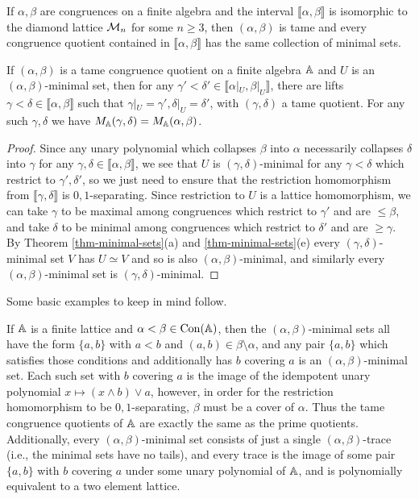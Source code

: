 \begin{appendices}
\begin{cor} If $\alpha,\beta$ are congruences on a finite algebra and the interval $\llbracket \alpha, \beta \rrbracket$ is isomorphic to the diamond lattice $\mathcal{M}_n$ for some $n \ge 3$, then $(\alpha, \beta)$ is tame and every congruence quotient contained in $\llbracket \alpha, \beta \rrbracket$ has the same collection of minimal sets.
\end{cor}

\begin{prop} If $(\alpha,\beta)$ is a tame congruence quotient on a finite algebra $\mathbb{A}$ and $U$ is an $(\alpha,\beta)$-minimal set, then for any $\gamma' < \delta' \in \llbracket \alpha|_U ,\beta|_U \rrbracket$, there are lifts $\gamma < \delta \in \llbracket \alpha, \beta \rrbracket$ such that $\gamma|_U = \gamma', \delta|_U = \delta'$, with $(\gamma,\delta)$ a tame quotient. For any such $\gamma, \delta$ we have $M_{\mathbb{A}}(\gamma,\delta) = M_{\mathbb{A}}(\alpha,\beta)$.
\end{prop}
\begin{proof} Since any unary polynomial which collapses $\beta$ into $\alpha$ necessarily collapses $\delta$ into $\gamma$ for any $\gamma,\delta \in \llbracket \alpha, \beta \rrbracket$, we see that $U$ is $(\gamma,\delta)$-minimal for any $\gamma < \delta$ which restrict to $\gamma', \delta'$, so we just need to ensure that the restriction homomorphism from $\llbracket \gamma, \delta \rrbracket$ is $0,1$-separating. Since restriction to $U$ is a lattice homomorphism, we can take $\gamma$ to be maximal among congruences which restrict to $\gamma'$ and are $\le \beta$, and take $\delta$ to be minimal among congruences which restrict to $\delta'$ and are $\ge \gamma$. By Theorem \ref{thm-minimal-sets}(a) and \ref{thm-minimal-sets}(e) every $(\gamma,\delta)$-minimal set $V$ has $U \simeq V$ and so is also $(\alpha,\beta)$-minimal, and similarly every $(\alpha,\beta)$-minimal set is $(\gamma,\delta)$-minimal.
\end{proof}

Some basic examples to keep in mind follow.

\begin{ex} If $\mathbb{A}$ is a finite lattice and $\alpha < \beta \in \operatorname{Con}(\mathbb{A})$, then the $(\alpha,\beta)$-minimal sets all have the form $\{a,b\}$ with $a < b$ and $(a,b) \in \beta\setminus \alpha$, and any pair $\{a,b\}$ which satisfies those conditions and additionally has $b$ covering $a$ is an $(\alpha,\beta)$-minimal set. Each such set with $b$ covering $a$ is the image of the idempotent unary polynomial $x \mapsto (x \wedge b) \vee a$, however, in order for the restriction homomorphism to be $0,1$-separating, $\beta$ must be a cover of $\alpha$. Thus the tame congruence quotients of $\mathbb{A}$ are exactly the same as the prime quotients. Additionally, every $(\alpha,\beta)$-minimal set consists of just a single $(\alpha,\beta)$-trace (i.e., the minimal sets have no tails), and every trace is the image of some pair $\{a,b\}$ with $b$ covering $a$ under some unary polynomial of $\mathbb{A}$, and is polynomially equivalent to a two element lattice.
\end{ex}


\end{appendices}
